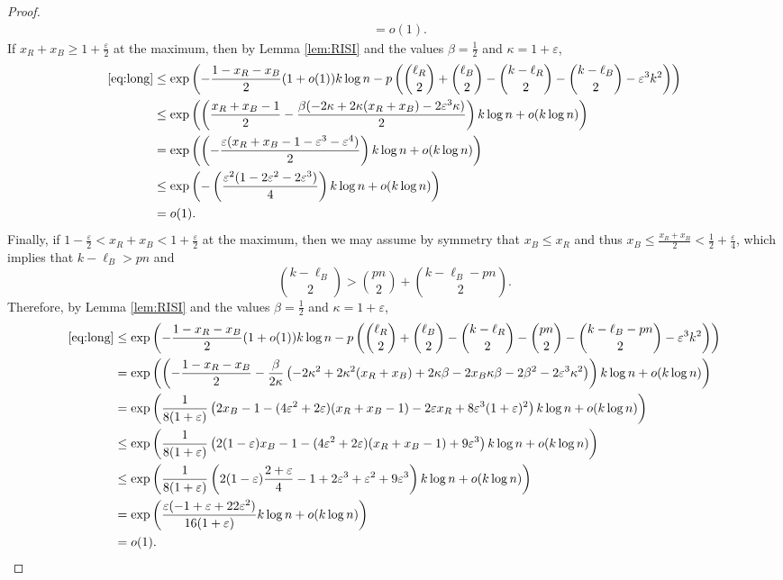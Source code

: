 \documentclass{article}
\begin{document}
\begin{proof}
\begin{align*}
    &=o(1).
\end{align*}
If $x_R+x_B\ge 1+\frac{\varepsilon}{2}$ at the maximum,  then by Lemma \ref{lem:RISI} and the values $\beta=\frac12$ and $\kappa=1+\varepsilon$,
\begin{align*}
    \eqref{eq:long}&\leq  \exp \left( -\frac{1-x_R-x_B}{2}(1+o(1))k \log {n} -p\left( \binom{\ell_R}{2} +\binom{\ell_B}{2}- \binom{k-\ell_R}{2} -\binom{k-\ell_B}{2} -\varepsilon^3k^2\right) \right)\\
        &\leq \exp \left(\left( \frac{x_R+x_B-1}{2} - \frac{\beta (-2\kappa+2\kappa(x_R+x_B)-2\varepsilon^3\kappa)}{2}\right)k\log n +o(k\log n)\right)\\
        &=\exp \left( \left( -\frac{\varepsilon(x_R+x_B-1-\varepsilon^3-\varepsilon^4) }{2}\right)k\log n +o(k\log n)\right)\\
        &\le \exp \left( - \left( \frac{\varepsilon^2(1-2\varepsilon^2-2\varepsilon^3)}{4}\right)k\log n +o(k\log n)\right)\\
        &=o(1).
        \end{align*}
Finally, if $1-\frac{\varepsilon}{2}<x_R+x_B<1+\frac{\varepsilon}{2}$ at the maximum, then we may assume by symmetry that $x_B\le x_R$ and thus $x_B\le \frac{x_R+x_B}{2}< \frac12+\frac{\varepsilon}{4}$, which implies that 
$k-\ell_B>pn$ and 
\[
 {k-\ell_B\choose 2} > {pn\choose 2}+{k-\ell_B-pn\choose 2}.
\]
Therefore, by Lemma \ref{lem:RISI} and the values $\beta=\frac12$ and $\kappa=1+\varepsilon$,
\begin{align*}
    \eqref{eq:long}&\leq  \exp \left( -\frac{1-x_R-x_B}{2}(1+o(1))k \log {n} -p\left( \binom{\ell_R}{2} +\binom{\ell_B}{2}- \binom{k-\ell_R}{2} - {pn\choose 2}-{k-\ell_B-pn\choose 2}-\varepsilon^3k^2\right) \right)\\
    &= \exp\left( \left(-\frac{1-x_R-x_B}{2}-\frac{\beta}{2\kappa}\left( -2\kappa^2+2\kappa^2(x_R+x_B)+2\kappa\beta-2x_B\kappa\beta-2\beta^2-2\varepsilon^3\kappa^2\right)\right)k\log{n}+o(k\log {n})    \right)\\
    &= \exp\left(\frac{1}{8(1+\varepsilon)}\left( 2x_B-1-(4\varepsilon^2+2\varepsilon)(x_R+x_B-1)-2\varepsilon x_R+8\varepsilon^3(1+\varepsilon)^2\right) k\log{n}+o(k\log {n})\right)\\
    &\le \exp\left(\frac{1}{8(1+\varepsilon)}\left(2(1-\varepsilon)x_B-1-(4\varepsilon^2+2\varepsilon)(x_R+x_B-1)+9\varepsilon^3\right)k\log{n}+o(k\log {n})\right)\\
    &\le \exp\left(\frac{1}{8(1+\varepsilon)}\left(2(1-\varepsilon)\frac{2+\varepsilon}{4}-1+2\varepsilon^3+\varepsilon^2+9\varepsilon^3\right)k\log{n}+o(k\log {n})\right)\\
    &=\exp\left(\frac{\varepsilon(-1+\varepsilon+22\varepsilon^2)}{16(1+\varepsilon)}k\log{n}+o(k\log {n})\right)\\
        &=o(1).
        \end{align*}
\end{proof}
\end{document}
